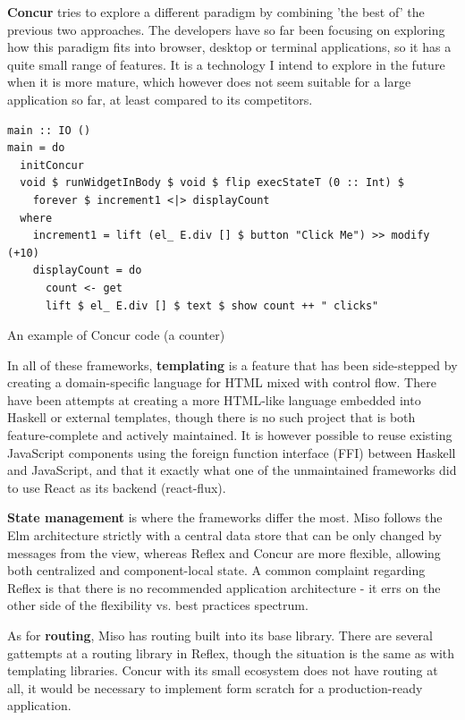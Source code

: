 \documentclass[english,odsaz]{fitthesis}
\begin{document}
\textbf{Concur} \cite{concur} tries to explore a different paradigm by combining 'the best
of' the previous two approaches. The developers have so far been focusing on
exploring how this paradigm fits into browser, desktop or terminal applications,
so it has a quite small range of features. It is a technology I intend to explore
in the future when it is more mature, which however does not seem suitable for a
large application so far, at least compared to its competitors.

\begin{listing}[htbp]
\begin{verbatim}
main :: IO ()
main = do
  initConcur
  void $ runWidgetInBody $ void $ flip execStateT (0 :: Int) $
    forever $ increment1 <|> displayCount
  where
    increment1 = lift (el_ E.div [] $ button "Click Me") >> modify (+10)
    displayCount = do
      count <- get
      lift $ el_ E.div [] $ text $ show count ++ " clicks"
\end{verbatim}
\caption{An example of Concur code (a counter)}
\end{listing}

In all of these frameworks, \textbf{templating} is a feature that has been side-stepped
by creating a domain-specific language for HTML mixed with control flow. There
have been attempts at creating a more HTML-like language embedded into Haskell
or external templates, though there is no such project that is both
feature-complete and actively maintained. It is however possible to reuse
existing JavaScript components using the foreign function interface (FFI)
between Haskell and JavaScript, and that it exactly what one of the unmaintained
frameworks did to use React as its backend (react-flux).

\textbf{State management} is where the frameworks differ the most. Miso follows the Elm
architecture strictly with a central data store that can be only changed by
messages from the view, whereas Reflex and Concur are more flexible, allowing
both centralized and component-local state. A common complaint regarding Reflex
is that there is no recommended application architecture - it errs on the
other side of the flexibility vs. best practices spectrum.

As for \textbf{routing}, Miso has routing built into its base library. There are several
gattempts at a routing library in Reflex, though the situation is the same as
with templating libraries. Concur with its small ecosystem does not have routing
at all, it would be necessary to implement form scratch for a production-ready
application.
\end{document}
